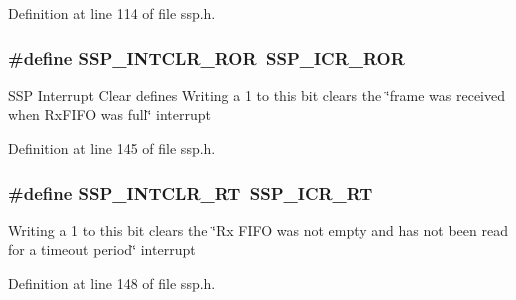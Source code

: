 Definition at line 114 of file ssp.\+h.

\subsubsection[{\texorpdfstring{S\+S\+P\+\_\+\+I\+N\+T\+C\+L\+R\+\_\+\+R\+OR}{SSP_INTCLR_ROR}}]{\setlength{\rightskip}{0pt plus 5cm}\#define S\+S\+P\+\_\+\+I\+N\+T\+C\+L\+R\+\_\+\+R\+OR~{\bf S\+S\+P\+\_\+\+I\+C\+R\+\_\+\+R\+OR}}\hypertarget{group___s_s_p___public___macros_gab79665cc09989a9730abb6b5452df1d7}{}\label{group___s_s_p___public___macros_gab79665cc09989a9730abb6b5452df1d7}
S\+SP Interrupt Clear defines Writing a 1 to this bit clears the \char`\"{}frame was received when
\+Rx\+F\+I\+F\+O was full\char`\"{} interrupt 

Definition at line 145 of file ssp.\+h.

\subsubsection[{\texorpdfstring{S\+S\+P\+\_\+\+I\+N\+T\+C\+L\+R\+\_\+\+RT}{SSP_INTCLR_RT}}]{\setlength{\rightskip}{0pt plus 5cm}\#define S\+S\+P\+\_\+\+I\+N\+T\+C\+L\+R\+\_\+\+RT~{\bf S\+S\+P\+\_\+\+I\+C\+R\+\_\+\+RT}}\hypertarget{group___s_s_p___public___macros_ga36b024118d27e68540e8e403b897ed75}{}\label{group___s_s_p___public___macros_ga36b024118d27e68540e8e403b897ed75}
Writing a 1 to this bit clears the \char`\"{}\+Rx F\+I\+F\+O was not empty and
has not been read for a timeout period\char`\"{} interrupt 

Definition at line 148 of file ssp.\+h.

